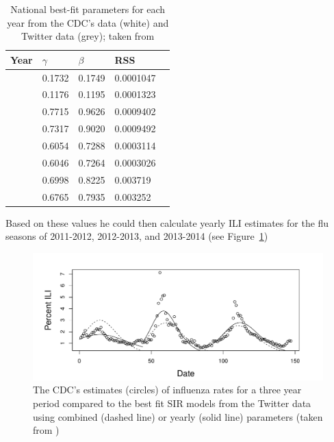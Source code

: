 \documentclass[11pt, a4paper]{report}\usepackage[]{graphicx}\usepackage[]{color}
\begin{document}
\begin{table}[h]
\centering
\begin{tabular}{l l l l l}

 Year & \(\gamma\) & \(\beta\) & RSS\\ \hline
& 0.1732 & 0.1749  & 0.0001047   \\ 
 {\multirow{-2}{*}{ 2011-2012 }}  & \cellcolor{grey}0.1176  & \cellcolor{grey}0.1195  & \cellcolor{grey}0.0001323  \\ \cline{2-4}
  {\multirow{2}{*}{ 2012-2013 }}& 0.7715 & 0.9626 & 0.0009402   \\ 
   & \cellcolor{grey}0.7317  & \cellcolor{grey}0.9020 & \cellcolor{grey}0.0009492   \\ \cline{2-4}
  {\multirow{2}{*}{ 2013-2014 }}& 0.6054 & 0.7288   & 0.0003114   \\ 
   & \cellcolor{grey}0.6046 & \cellcolor{grey}0.7264 & \cellcolor{grey}0.0003026  \\ \cline{2-4}
  {\multirow{2}{*}{ Combined }}& 0.6998 & 0.8225  & 0.003719   \\ 
   & \cellcolor{grey}0.6765  & \cellcolor{grey}0.7935  & \cellcolor{grey}0.003252   \\ 
\end{tabular}
\caption{National best-fit parameters for each year from the CDC's data (white) and Twitter data (grey); taken from \citep{bodnar_ground_2014}}
\label{tab:nationalparams}
\end{table}

Based on these values he could then calculate yearly ILI estimates for the flu seasons of 2011-2012, 2012-2013, and 2013-2014 (see Figure~\ref{fig:cdc_fit_bodnar_thesis_SIR})

\begin{figure}[h]
  \centering
    \includegraphics[width=.9\textwidth]{todd_bodnar_SIR.png}
  \caption{The CDC's estimates (circles) of influenza rates for a three year period compared to the best fit SIR models from the Twitter data using combined (dashed line) or yearly (solid line) parameters (taken from \citep{bodnar_data_2015})}
  \label{fig:cdc_fit_bodnar_thesis_SIR}
  \end{figure}
\end{document}
